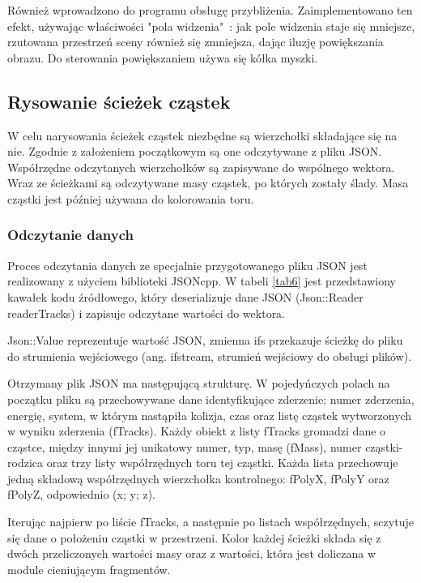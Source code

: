 Również wprowadzono do programu obsługę przybliżenia. Zaimplementowano ten efekt, używając właściwości "pola widzenia"\ : jak pole widzenia staje się mniejsze, rzutowana przestrzeń sceny również się zmniejsza, dając iluzję powiększania obrazu. Do sterowania powiększaniem używa się kółka myszki.

\subsection{Rysowanie ścieżek cząstek}
W celu narysowania ścieżek cząstek niezbędne są wierzchołki składające się na nie. Zgodnie z założeniem początkowym są one odczytywane z pliku JSON. Współrzędne odczytanych wierzchołków są zapisywane do wspólnego wektora. Wraz ze ścieżkami są odczytywane masy cząstek, po których zostały ślady. Masa cząstki jest później używana do kolorowania toru.

\subsubsection{Odczytanie danych}
Proces odczytania danych ze specjalnie przygotowanego pliku JSON jest realizowany z użyciem biblioteki JSONcpp. W tabeli \ref{tab6} jest przedstawiony kawałek kodu źródłowego, który deserializuje dane JSON (Json::Reader readerTracks) i zapisuje odczytane wartości do wektora. 

Json::Value reprezentuje wartość JSON, zmienna ifs przekazuje ścieżkę do pliku do strumienia wejściowego (ang. ifstream, strumień wejściowy do obsługi plików). 

Otrzymany plik JSON ma następującą strukturę. W pojedyńczych polach na początku pliku są przechowywane dane identyfikujące zderzenie: numer zderzenia, energię, system, w którym nastąpiła kolizja, czas oraz listę cząstek wytworzonych w wyniku zderzenia (fTracks). Każdy obiekt z listy fTracks gromadzi dane o cząstce, między innymi jej unikatowy numer, typ, masę (fMass), numer cząstki-rodzica oraz trzy listy współrzędnych toru tej cząstki. Każda lista przechowuje jedną składową współrzędnych wierzchołka kontrolnego: fPolyX, fPolyY oraz fPolyZ, odpowiednio (x; y; z). 

Iterując najpierw po liście fTracks, a następnie po listach współrzędnych, sczytuje się dane o położeniu cząstki w przestrzeni. Kolor każdej ścieżki składa się z dwóch przeliczonych wartości masy oraz z wartości, która jest doliczana w module cieniującym fragmentów.    

